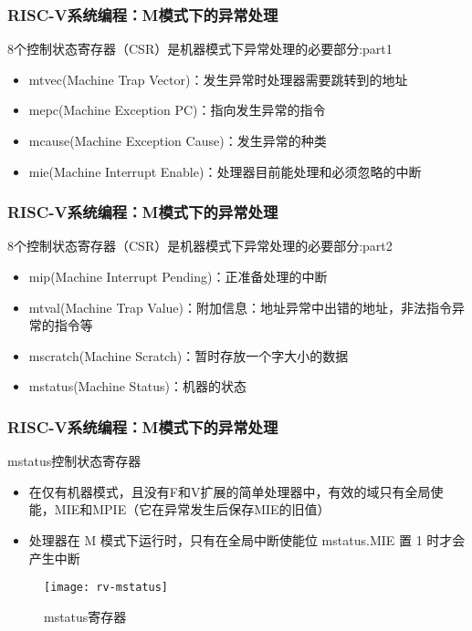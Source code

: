 
\begin{frame}
    \frametitle{RISC-V系统编程：M模式下的异常处理}
    8个控制状态寄存器（CSR）是机器模式下异常处理的必要部分:part1
    \begin{itemize}
        \item mtvec(Machine Trap Vector)：发生异常时处理器需要跳转到的地址
        \item mepc(Machine Exception PC)：指向发生异常的指令
        \item mcause(Machine Exception Cause)：发生异常的种类
        \item mie(Machine Interrupt Enable)：处理器目前能处理和必须忽略的中断
                
    \end{itemize}
    
    
\end{frame}

\begin{frame}
    \frametitle{RISC-V系统编程：M模式下的异常处理}
    8个控制状态寄存器（CSR）是机器模式下异常处理的必要部分:part2
    \begin{itemize}
        \item mip(Machine Interrupt Pending)：正准备处理的中断
        \item mtval(Machine Trap Value)：附加信息：地址异常中出错的地址，非法指令异常的指令等
        \item mscratch(Machine Scratch)：暂时存放一个字大小的数据
        \item mstatus(Machine Status)：机器的状态
        
    \end{itemize}
    
    
\end{frame}

\begin{frame}
    \frametitle{RISC-V系统编程：M模式下的异常处理}
     mstatus控制状态寄存器
    \begin{itemize}
        \item 在仅有机器模式，且没有F和V扩展的简单处理器中，有效的域只有全局使能，MIE和MPIE（它在异常发生后保存MIE的旧值）
        \item 处理器在 M 模式下运行时，只有在全局中断使能位 mstatus.MIE 置 1 时才会产生中断
        
    \end{itemize}
    
    \begin{figure}
    \centering
    \texttt{[image: rv-mstatus]}
    \caption{mstatus寄存器}
    \end{figure}
    
\end{frame}

